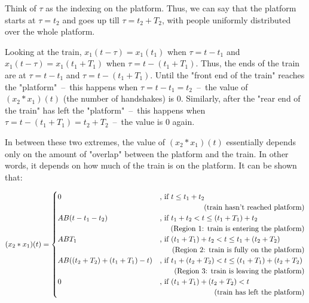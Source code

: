 Think of $\tau$ as the indexing on the platform. Thus, we can say that the platform starts at $\tau = t_2$ and goes up till $\tau = t_2 + T_2$, with people uniformly distributed over the whole platform.

Looking at the train, $x_1(t-\tau)=x_1(t_1)$ when $\tau=t-t_1$ and $x_1(t-\tau)=x_1(t_1+T_1)$ when $\tau=t-(t_1+T_1)$. Thus, the ends of the train are at $\tau=t-t_1$ and $\tau=t-(t_1+T_1)$. Until the "front end of the train" reaches the "platform"\ --\ this happens when $\tau=t-t_1 = t_2$\ --\ the value of $(x_2\ast x_1)(t)$ (the number of handshakes) is 0. Similarly, after the "rear end of the train" has left the "platform"\ --\ this happens when $\tau=t-(t_1+T_1) = t_2+T_2$\ --\ the value is 0 again.

In between these two extremes, the value of $(x_2\ast x_1)(t)$ essentially depends only on the amount of "overlap" between the platform and the train. In other words, it depends on how much of the train is on the platform. It can be shown that:

\[
 (x_2\ast x_1)(t) =
  \begin{cases}
   0    & \text{, if } t \leq t_1 + t_2 \\
   & \phantom{\text{, if $t_1+ (t_2 + T_2) < t \leq (t_1+ T_1) + (t_2 + T_2)$;}}\llap{\text{ (train hasn't reached platform)}} \\
   A B (t-t_1-t_2)    & \text{, if } t_1 + t_2 < t \leq (t_1+ T_1) + t_2 \\
   & \phantom{\text{, if $t_1+ (t_2 + T_2) < t \leq (t_1+ T_1) + (t_2 + T_2)$;}}\llap{\text{ (Region 1: train is entering the platform)}}\\
   A B T_1    & \text{, if } (t_1+ T_1) + t_2 < t \leq t_1+ (t_2 + T_2) \\
   & \phantom{\text{, if $t_1+ (t_2 + T_2) < t \leq (t_1+ T_1) + (t_2 + T_2)$;}}\llap{\text{  (Region 2: train is fully on the platform)}}\\
   A B ((t_2+T_2)+(t_1+T_1)-t)    & \text{, if } t_1+ (t_2 + T_2) < t \leq (t_1+ T_1) + (t_2 + T_2) \\
   & \phantom{\text{, if $t_1+ (t_2 + T_2) < t \leq (t_1+ T_1) + (t_2 + T_2)$;}}\llap{\text{  (Region 3: train is leaving the platform)}}\\
   0    & \text{, if } (t_1+ T_1) + (t_2 + T_2) < t \\
   & \phantom{\text{, if $t_1+ (t_2 + T_2) < t \leq (t_1+ T_1) + (t_2 + T_2)$;}}\llap{\text{  (train has left the platform)}}
  \end{cases}
\]

